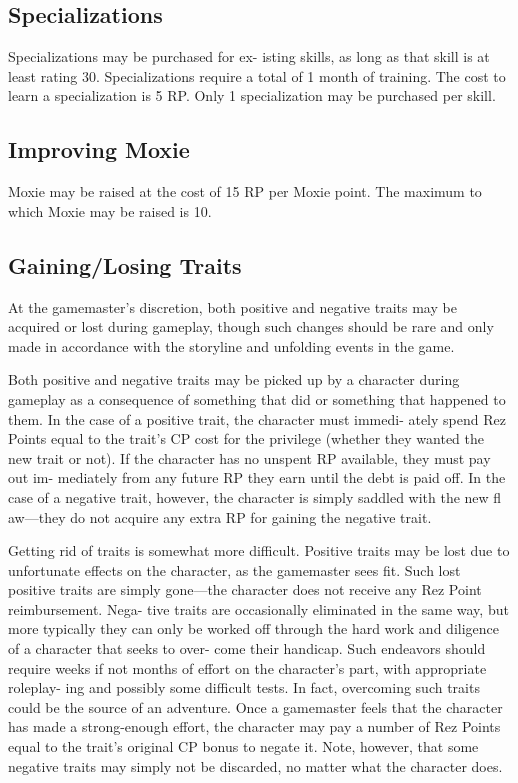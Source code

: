 \subsection{Specializations}

Specializations may be purchased for ex-
isting skills, as long as that skill is at least 
rating 30. Specializations require a total 
of 1 month of training. The cost to learn a 
specialization is 5 RP. Only 1 specialization 
may be purchased per skill.

\subsection{Improving Moxie}

Moxie may be raised at the cost of 15 RP per 
Moxie point. The maximum to which Moxie 
may be raised is 10.

\subsection{Gaining/Losing Traits}

At the gamemaster's discretion, both positive 
and negative traits may be acquired or lost 
during gameplay, though such changes should 
be rare and only made in accordance with the 
storyline and unfolding events in the game.

Both positive and negative traits may be 
picked up by a character during gameplay 
as a consequence of something that did or 
something that happened to them. In the case 
of a positive trait, the character must immedi-
ately spend Rez Points equal to the trait's CP 
cost for the privilege (whether they wanted 
the new trait or not). If the character has no 
unspent RP available, they must pay out im-
mediately from any future RP they earn until 
the debt is paid off. In the case of a negative 
trait, however, the character is simply saddled 
with the new fl aw—they do not acquire any 
extra RP for gaining the negative trait.

Getting rid of traits is somewhat more 
difficult. Positive traits may be lost due to 
unfortunate effects on the character, as the 
gamemaster sees fit. Such lost positive traits 
are simply gone—the character does not 
receive any Rez Point reimbursement. Nega-
tive traits are occasionally eliminated in the 
same way, but more typically they can only 
be worked off through the hard work and 
diligence of a character that seeks to over-
come their handicap. Such endeavors should 
require weeks if not months of effort on the 
character's part, with appropriate roleplay-
ing and possibly some difficult tests. In fact, 
overcoming such traits could be the source 
of an adventure. Once a gamemaster feels 
that the character has made a strong-enough 
effort, the character may pay a number of 
Rez Points equal to the trait's original CP 
bonus to negate it. Note, however, that some 
negative traits may simply not be discarded, 
no matter what the character does.

